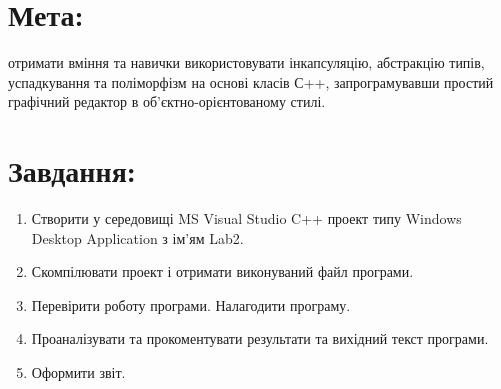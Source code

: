 \documentclass[14pt]{article}
\begin{document}

\tableofcontents
\newpage

\section{Мета:}
отримати вміння та навички використовувати інкапсуляцію,
абстракцію типів, успадкування та поліморфізм на основі класів С++,
запрограмувавши простий графічний редактор в об’єктно-орієнтованому
стилі.
\section{Завдання:}
\begin{enumerate}
    \item Створити у середовищі MS Visual Studio C++ проект типу Windows Desktop Application з ім’ям Lab2.
    \item Скомпілювати проект і отримати виконуваний файл програми.
    \item Перевірити роботу програми. Налагодити програму.
    \item Проаналізувати та прокоментувати результати та вихідний текст програми.
    \item Оформити звіт.
\end{enumerate}
\end{document}
